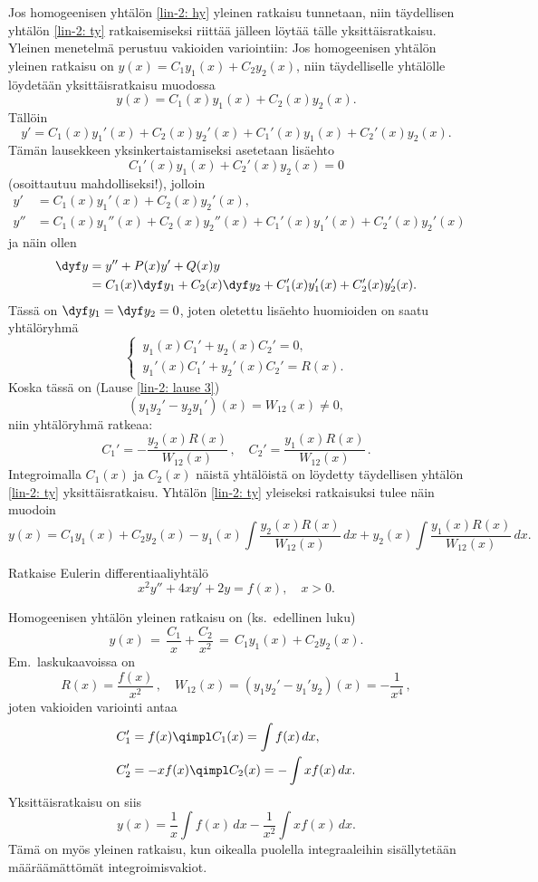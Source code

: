 Jos homogeenisen yhtälön \eqref{lin-2: hy} yleinen ratkaisu tunnetaan, niin täydellisen
yhtälön \eqref{lin-2: ty} ratkaisemiseksi riittää jälleen löytää tälle yksittäisratkaisu.
Yleinen menetelmä perustuu vakioiden variointiin: Jos homogeenisen yhtälön yleinen ratkaisu
on $y(x)=C_1y_1(x)+C_2y_2(x)$, niin täydelliselle yhtälölle löydetään yksittäisratkaisu
muodossa
\[
y(x)=C_1(x)y_1(x)+C_2(x)y_2(x).
\]
Tällöin
\[
y'=C_1(x)y_1'(x)+C_2(x)y_2'(x)+C_1'(x)y_1(x)+C_2'(x)y_2(x).
\]
Tämän lausekkeen yksinkertaistamiseksi asetetaan lisäehto
\[
C_1'(x)y_1(x)+C_2'(x)y_2(x)=0
\]
(osoittautuu mahdolliseksi!), jolloin
\begin{align*}
y'  &= C_1(x)y_1'(x)+C_2(x)y_2'(x), \\
y'' &= C_1(x)y_1''(x)+C_2(x)y_2''(x) +C_1'(x)y_1'(x)+C_2'(x)y_2'(x)
\end{align*}
ja näin ollen
\begin{align*}
\dyf y &= y''+P(x)y'+Q(x)y \\
       &= C_1(x)\dyf y_1+C_2(x)\dyf y_2+C_1'(x)y_1'(x)+C_2'(x)y_2'(x).
\end{align*}
Tässä on $\dyf y_1=\dyf y_2=0$, joten oletettu lisäehto huomioiden on saatu yhtälöryhmä
\[
\begin{cases}
\,y_1(x)C_1'+y_2(x)C_2'=0, \\
\,y_1'(x)C_1'+y_2'(x)C_2'=R(x).
\end{cases}
\]
Koska tässä on (Lause \ref{lin-2: lause 3})
\[
(y_1y_2'-y_2y_1')(x)=W_{12}(x)\neq 0,
\]
niin yhtälöryhmä ratkeaa:
\[
C_1'=-\frac{y_2(x)R(x)}{W_{12}(x)}\,,\quad C_2'=\frac{y_1(x)R(x)}{W_{12}(x)}\,.
\]
Integroimalla $C_1(x)$ ja $C_2(x)$ näistä yhtälöistä on löydetty täydellisen yhtälön
\eqref{lin-2: ty} yksittäisratkaisu. Yhtälön \eqref{lin-2: ty} yleiseksi ratkaisuksi tulee näin
muodoin
\[
y(x)=C_1y_1(x)+C_2y_2(x)
    -y_1(x)\int\frac{y_2(x)R(x)}{W_{12}(x)}\,dx+y_2(x)\int\frac{y_1(x)R(x)}{W_{12}(x)}\,dx.
\]

\begin{Exa}
Ratkaise Eulerin differentiaaliyhtälö
\[
x^2y''+4xy'+2y=f(x), \quad x>0.
\]
\end{Exa}
\ratk Homogeenisen yhtälön yleinen ratkaisu on (ks.\ edellinen luku)
\[
y(x) \,=\, \frac{C_1}{x}+\frac{C_2}{x^2} \,=\, C_1y_1(x)+C_2y_2(x).
\]
Em.\ laskukaavoissa on
\[
R(x)=\frac{f(x)}{x^2}\,, \quad W_{12}(x)=(y_1y_2'-y_1'y_2)(x)=-\frac{1}{x^4}\,,
\] 
joten vakioiden variointi antaa
\begin{align*}
&C_1'= f(x) \qimpl C_1(x)=\int f(x)\,dx, \\
&C_2'=-xf(x) \qimpl C_2(x)=-\int xf(x)\,dx.
\end{align*}
Yksittäisratkaisu on siis
\[
y(x) = \frac{1}{x}\int f(x)\,dx - \frac{1}{x^2}\int xf(x)\,dx.
\]
Tämä on myös yleinen ratkaisu, kun oikealla puolella integraaleihin sisällytetään
määräämättömät integroimisvakiot. \loppu


